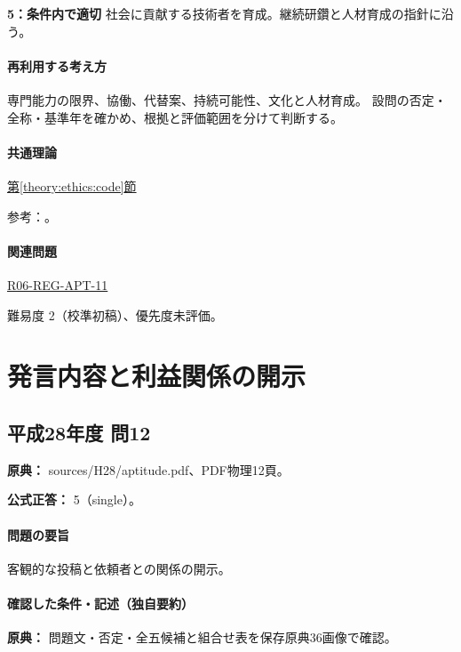 \noindent\textbf{5：条件内で適切} 社会に貢献する技術者を育成。継続研鑽と人材育成の指針に沿う。\par

\paragraph{再利用する考え方} 専門能力の限界、協働、代替案、持続可能性、文化と人材育成。 設問の否定・全称・基準年を確かめ、根拠と評価範囲を分けて判断する。

\paragraph{共通理論} \hyperref[theory:ethics:code]{第\ref*{theory:ethics:code}節}

\par 参考：\cite{ipej_ethics2023}。

\paragraph{関連問題} \hyperref[q:r06-reg-apt-11]{R06-REG-APT-11}

\par 難易度 2（校準初稿）、優先度未評価。

\section{発言内容と利益関係の開示}

\subsection{平成28年度 問12}
\label{q:h28-reg-apt-12}

\noindent\textbf{原典：} sources/H28/aptitude.pdf、PDF物理12頁。

\textbf{公式正答：} 5（single）。

\paragraph{問題の要旨} 客観的な投稿と依頼者との関係の開示。

\paragraph{確認した条件・記述（独自要約）}\mbox{}\par

\noindent\textbf{原典：} 問題文・否定・全五候補と組合せ表を保存原典36画像で確認。\par

